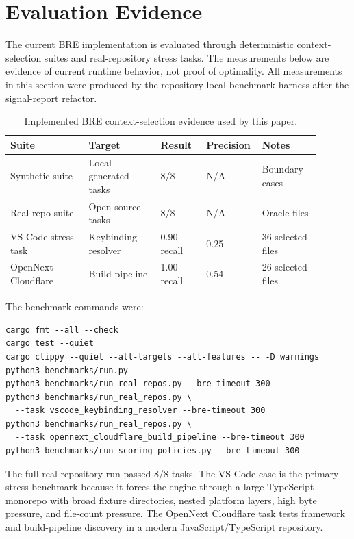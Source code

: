 \documentclass[11pt,onecolumn]{article}
\begin{document}
\section{Evaluation Evidence}
The current BRE implementation is evaluated through deterministic context-selection suites and real-repository stress tasks. The measurements below are evidence of current runtime behavior, not proof of optimality. All measurements in this section were produced by the repository-local benchmark harness after the signal-report refactor.

\begin{table}[h]
\centering
{\small
\setlength{\tabcolsep}{4pt}
\begin{tabular}{p{0.24\linewidth}p{0.22\linewidth}p{0.14\linewidth}p{0.12\linewidth}p{0.18\linewidth}}
\toprule
Suite & Target & Result & Precision & Notes \\
\midrule
Synthetic suite & Local generated tasks & 8/8 & N/A & Boundary cases \\
Real repo suite & Open-source tasks & 8/8 & N/A & Oracle files \\
VS Code stress task & Keybinding resolver & 0.90 recall & 0.25 & 36 selected files \\
OpenNext Cloudflare & Build pipeline & 1.00 recall & 0.54 & 26 selected files \\
\bottomrule
\end{tabular}
}
\caption{Implemented BRE context-selection evidence used by this paper.}
\end{table}

The benchmark commands were:
\begin{verbatim}
cargo fmt --all --check
cargo test --quiet
cargo clippy --quiet --all-targets --all-features -- -D warnings
python3 benchmarks/run.py
python3 benchmarks/run_real_repos.py --bre-timeout 300
python3 benchmarks/run_real_repos.py \
  --task vscode_keybinding_resolver --bre-timeout 300
python3 benchmarks/run_real_repos.py \
  --task opennext_cloudflare_build_pipeline --bre-timeout 300
python3 benchmarks/run_scoring_policies.py --bre-timeout 300
\end{verbatim}

The full real-repository run passed 8/8 tasks. The VS Code case is the primary stress benchmark because it forces the engine through a large TypeScript monorepo with broad fixture directories, nested platform layers, high byte pressure, and file-count pressure. The OpenNext Cloudflare task tests framework and build-pipeline discovery in a modern JavaScript/TypeScript repository.
\end{document}
